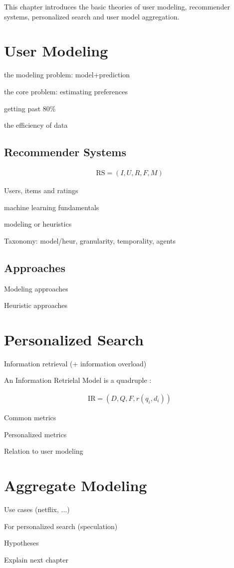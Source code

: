 This chapter introduces the basic theories of 
user modeling, recommender systems, personalized search and user model aggregation.

\section{User Modeling}









the modeling problem: model+prediction

the core problem: estimating preferences

getting past 80\%

the efficiency of data


\subsection{Recommender Systems}

\begin{eqnarray}
  \mathrm{RS} = (I, U, R, F, M)
\end{eqnarray}

Users, items and ratings

machine learning fundamentals

modeling or heuristics

Taxonomy: model/heur, granularity, temporality, agents

\subsection{Approaches}

Modeling approaches

Heuristic approaches


\section{Personalized Search}

Information retrieval (+ information overload)

An Information Retrielal Model is a quadruple \citep[p23]{Baeza-Yates1999}:

\begin{eqnarray}
  \mathrm{IR} = (D, Q, F, r(q_i, d_i))
\end{eqnarray}

Common metrics

Personalized metrics

Relation to user modeling


\section{Aggregate Modeling}

Use cases (netflix, ...)

For personalized search (speculation)

Hypotheses

Explain next chapter


